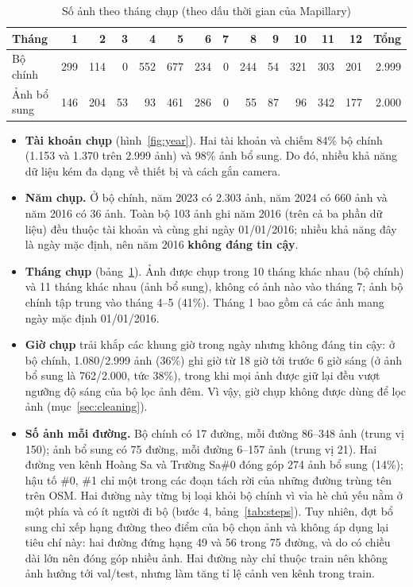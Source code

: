 \begin{table}[H]
\centering
\caption{Số ảnh theo tháng chụp (theo dấu thời gian của Mapillary)}
\label{tab:month}
\setlength{\tabcolsep}{3.5pt}
\begin{tabular}{l rrrrrrrrrrrr r}
\toprule
\textbf{Tháng} & 1 & 2 & 3 & 4 & 5 & 6 & 7 & 8 & 9 & 10 & 11 & 12 & \textbf{Tổng} \\
\midrule
Bộ chính & 299 & 114 & 0 & 552 & 677 & 234 & 0 & 244 & 54 & 321 & 303 & 201 & 2.999 \\
Ảnh bổ sung & 146 & 204 & 53 & 93 & 461 & 286 & 0 & 55 & 87 & 96 & 342 & 177 & 2.000 \\
\bottomrule
\end{tabular}
\end{table}

\begin{itemize}
  \item \textbf{Tài khoản chụp} (hình~\ref{fig:year}). Hai tài khoản  và  chiếm 84\% bộ chính (1.153 và 1.370 trên 2.999 ảnh) và 98\% ảnh bổ sung. Do đó, nhiều khả năng dữ liệu kém đa dạng về thiết bị và cách gắn camera.
  \item \textbf{Năm chụp.} Ở bộ chính, năm 2023 có 2.303 ảnh, năm 2024 có 660 ảnh và năm 2016 có 36 ảnh. Toàn bộ 103 ảnh ghi năm 2016 (trên cả ba phần dữ liệu) đều thuộc tài khoản  và cùng ghi ngày 01/01/2016; nhiều khả năng đây là ngày mặc định, nên năm 2016 \textbf{không đáng tin cậy}.
  \item \textbf{Tháng chụp} (bảng~\ref{tab:month}). Ảnh được chụp trong 10 tháng khác nhau (bộ chính) và 11 tháng khác nhau (ảnh bổ sung), không có ảnh nào vào tháng 7; ảnh bộ chính tập trung vào tháng 4--5 (41\%). Tháng 1 bao gồm cả các ảnh mang ngày mặc định 01/01/2016.
  \item \textbf{Giờ chụp} trải khắp các khung giờ trong ngày nhưng không đáng tin cậy: ở bộ chính, 1.080/2.999 ảnh (36\%) ghi giờ từ 18 giờ tới trước 6 giờ sáng (ở ảnh bổ sung là 762/2.000, tức 38\%), trong khi mọi ảnh được giữ lại đều vượt ngưỡng độ sáng của bộ lọc ảnh đêm. Vì vậy, giờ chụp không được dùng để lọc ảnh (mục~\ref{sec:cleaning}).
  \item \textbf{Số ảnh mỗi đường.} Bộ chính có 17 đường, mỗi đường 86--348 ảnh (trung vị 150); ảnh bổ sung có 75 đường, mỗi đường 6--157 ảnh (trung vị 21). Hai đường ven kênh Hoàng Sa và Trường Sa\#0 đóng góp 274 ảnh bổ sung (14\%); hậu tố \#0, \#1 chỉ một trong các đoạn tách rời của những đường trùng tên trên OSM. Hai đường này từng bị loại khỏi bộ chính vì vỉa hè chủ yếu nằm ở một phía và có ít người đi bộ (bước 4, bảng~\ref{tab:steps}). Tuy nhiên, đợt bổ sung chỉ xếp hạng đường theo điểm của bộ chọn ảnh và không áp dụng lại tiêu chí này: hai đường đứng hạng 49 và 56 trong 75 đường, và do có chiều dài lớn nên đóng góp nhiều ảnh. Hai đường này chỉ thuộc train nên không ảnh hưởng tới val/test, nhưng làm tăng tỉ lệ cảnh ven kênh trong train.
\end{itemize}

